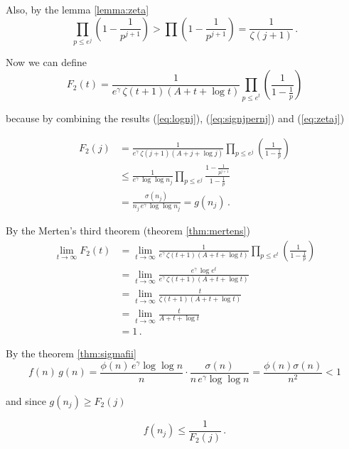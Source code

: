 \documentclass{article}
\theoremstyle{definition}
\begin{document}
Also, by the lemma \ref{lemma:zeta}
\begin{equation}
\label{eq:zetaj}
    \prod_{p\leq e^j}\left(1-\frac{1}{p^{j+1}}\right) > \prod \left(1-\frac{1}{p^{j+1}}\right) = \frac{1}{\zeta(j+1)}\,.
\end{equation}

Now we can define
\begin{equation*}
    F_2(t)=\frac{1}{e^\gamma\,\zeta(t+1)(A+t+\log t)} \prod_{p\leq e^t} \left(\frac{1}{1-\frac{1}{p}}\right)
\end{equation*}

because by combining the results (\ref{eq:lognj}), (\ref{eq:signjpernj}) and (\ref{eq:zetaj})

\begin{align*}
    F_2(j)& = \frac{1}{e^\gamma\,\zeta(j+1)(A+j+\log j)} \prod_{p\leq e^j} \left(\frac{1}{1-\frac{1}{p}}\right)\\
    & \leq \frac{1}{e^\gamma\,\log \log n_j} \prod_{p\leq e^j} \frac{1-\frac{1}{p^{j+1}}}{1-\frac{1}{p}}\\
    & = \frac{\sigma(n_j)}{n_j\,e^\gamma\,\log \log n_j} = g(n_j)\,.
\end{align*}

By the Merten's third theorem (theorem \ref{thm:mertens})
\begin{align*}
    \lim_{t \rightarrow \infty} F_2(t) & = \lim_{t \rightarrow \infty} \frac{1}{e^\gamma\,\zeta(t+1)(A+t+\log t)} \prod_{p\leq e^t} \left(\frac{1}{1-\frac{1}{p}}\right)\\
    & = \lim_{t \rightarrow \infty} \frac{e^\gamma\,\log e^t}{e^\gamma\,\zeta(t+1)(A+t+\log t)}\\
    & = \lim_{t \rightarrow \infty} \frac{t}{\zeta(t+1)(A+t+\log t)}\\
    & = \lim_{t \rightarrow \infty} \frac{t}{A+t+\log t}\\
    & = 1\,.
\end{align*}

By the theorem \ref{thm:sigmafii}
\begin{equation*}
    f(n)\,g(n) = \frac{\phi(n)\,e^\gamma \log\log n}{n} \cdot \frac{\sigma(n)}{n\,e^\gamma \log\log n} = \frac{\phi(n)\sigma(n)}{n^2}<1
\end{equation*}

and since $g(n_j) \geq F_2(j)$

\begin{equation*}
    f(n_j)\leq \frac{1}{F_2(j)}\,.
\end{equation*}
\end{document}
